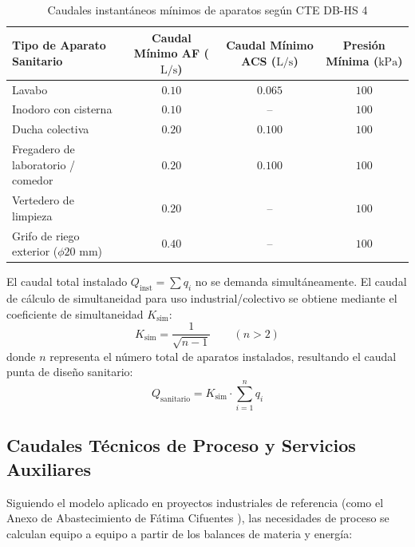 \documentclass{report}
\begin{document}
\begin{table}[H]
    \centering
    \caption{Caudales instantáneos mínimos de aparatos según CTE DB-HS 4}
    \label{tab:caudales_cte}
    \begin{tabular}{@{}lccc@{}}
        \toprule
        \textbf{Tipo de Aparato Sanitario} & \textbf{Caudal Mínimo AF ($\text{L/s}$)} & \textbf{Caudal Mínimo ACS ($\text{L/s}$)} & \textbf{Presión Mínima ($\text{kPa}$)} \\
        \midrule
        Lavabo & $0.10$ & $0.065$ & $100$ \\
        Inodoro con cisterna & $0.10$ & -- & $100$ \\
        Ducha colectiva & $0.20$ & $0.100$ & $100$ \\
        Fregadero de laboratorio / comedor & $0.20$ & $0.100$ & $100$ \\
        Vertedero de limpieza & $0.20$ & -- & $100$ \\
        Grifo de riego exterior ($\phi 20\text{ mm}$) & $0.40$ & -- & $100$ \\
        \bottomrule
    \end{tabular}
\end{table}

El caudal total instalado $Q_{\text{inst}} = \sum q_i$ no se demanda simultáneamente. El caudal de cálculo de simultaneidad para uso industrial/colectivo se obtiene mediante el coeficiente de simultaneidad $K_{\text{sim}}$:
\begin{equation}
    K_{\text{sim}} = \frac{1}{\sqrt{n - 1}} \qquad (n > 2)
\end{equation}
donde $n$ representa el número total de aparatos instalados, resultando el caudal punta de diseño sanitario:
\begin{equation}
    Q_{\text{sanitario}} = K_{\text{sim}} \cdot \sum_{i=1}^{n} q_i
\end{equation}

\subsection{Caudales Técnicos de Proceso y Servicios Auxiliares}
Siguiendo el modelo aplicado en proyectos industriales de referencia (como el Anexo de Abastecimiento de Fátima Cifuentes \cite{Fatima2025}), las necesidades de proceso se calculan equipo a equipo a partir de los balances de materia y energía:
\end{document}
